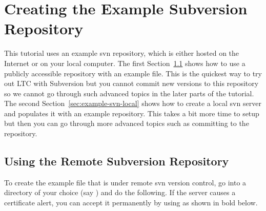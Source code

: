 \section{Creating the Example Subversion Repository} \label{sec:example-svn}

This tutorial uses an example svn repository, which is either hosted on the Internet or on your local computer.  The first Section~\ref{sec:example-svn-remote} shows how to use a publicly accessible repository with an example file.  This is the quickest way to try out LTC with Subversion but you cannot commit new versions to this repository so we cannot go through such advanced topics in the later parts of the tutorial.  The second Section~\ref{sec:example-svn-local} shows how to create a local svn server and populates it with an example repository.  This takes a bit more time to setup but then you can go through more advanced topics such as committing to the repository.

\subsection{Using the Remote Subversion Repository} \label{sec:example-svn-remote}

To create the example file that is under remote svn version control, go into a directory of your choice (say ) and do the following.  If the server causes a certificate alert, you can accept it permanently by using  as shown in bold below.


